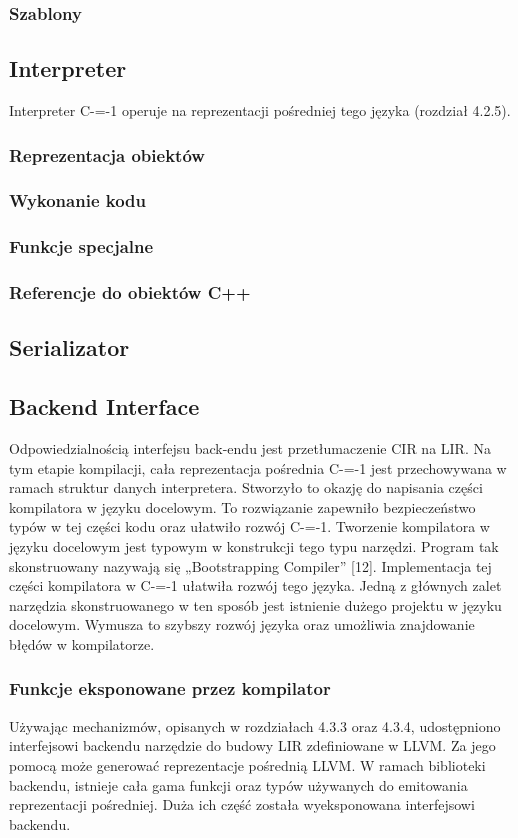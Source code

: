 \subsubsection{Szablony}

\subsection{Interpreter}
Interpreter C-=-1 operuje na reprezentacji pośredniej tego języka (rozdział 4.2.5).
\subsubsection{Reprezentacja obiektów}
\subsubsection{Wykonanie kodu}
\subsubsection{Funkcje specjalne}
\subsubsection{Referencje do obiektów C++}
\subsection{Serializator}
\subsection{Backend Interface}
\label{Backend_Interface}
Odpowiedzialnością interfejsu back-endu jest przetłumaczenie CIR na LIR. Na tym etapie kompilacji, cała reprezentacja pośrednia C-=-1 jest przechowywana w ramach struktur danych interpretera. Stworzyło to okazję do napisania części kompilatora w języku docelowym.
To rozwiązanie zapewniło bezpieczeństwo typów w tej części kodu oraz ułatwiło rozwój C-=-1. Tworzenie kompilatora w języku docelowym jest typowym w konstrukcji tego typu narzędzi. Program tak skonstruowany nazywają się „Bootstrapping Compiler” [12]. 
Implementacja tej części kompilatora w C-=-1 ułatwiła rozwój tego języka. Jedną z głównych zalet narzędzia skonstruowanego w ten sposób jest istnienie dużego projektu w języku docelowym. Wymusza to szybszy rozwój języka oraz umożliwia znajdowanie błędów w kompilatorze.
\subsubsection{Funkcje eksponowane przez kompilator}
Używając mechanizmów, opisanych w rozdziałach 4.3.3 oraz 4.3.4, udostępniono interfejsowi backendu narzędzie do budowy LIR zdefiniowane w LLVM. Za jego pomocą może generować reprezentacje pośrednią LLVM.
W ramach biblioteki backendu, istnieje cała gama funkcji oraz typów używanych do emitowania reprezentacji pośredniej. Duża ich część została wyeksponowana interfejsowi backendu.

